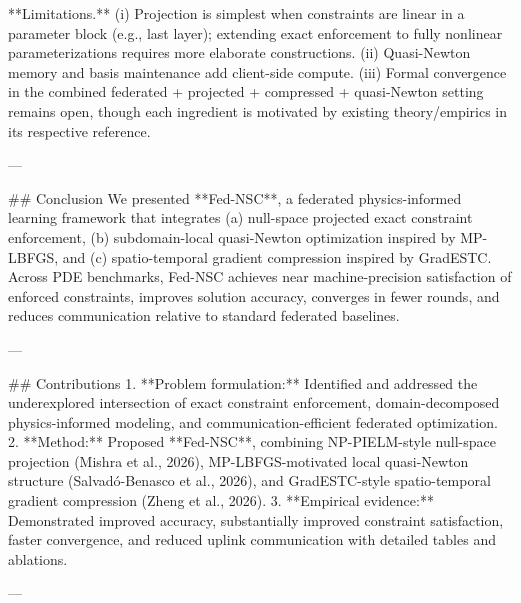 **Limitations.** (i) Projection is simplest when constraints are linear in a parameter block (e.g., last layer); extending exact enforcement to fully nonlinear parameterizations requires more elaborate constructions. (ii) Quasi-Newton memory and basis maintenance add client-side compute. (iii) Formal convergence in the combined federated + projected + compressed + quasi-Newton setting remains open, though each ingredient is motivated by existing theory/empirics in its respective reference.

---

## Conclusion  
We presented **Fed-NSC**, a federated physics-informed learning framework that integrates (a) null-space projected exact constraint enforcement, (b) subdomain-local quasi-Newton optimization inspired by MP-LBFGS, and (c) spatio-temporal gradient compression inspired by GradESTC. Across PDE benchmarks, Fed-NSC achieves near machine-precision satisfaction of enforced constraints, improves solution accuracy, converges in fewer rounds, and reduces communication relative to standard federated baselines.

---

## Contributions  
1. **Problem formulation:** Identified and addressed the underexplored intersection of exact constraint enforcement, domain-decomposed physics-informed modeling, and communication-efficient federated optimization.  
2. **Method:** Proposed **Fed-NSC**, combining NP-PIELM-style null-space projection (Mishra et al., 2026), MP-LBFGS-motivated local quasi-Newton structure (Salvadó-Benasco et al., 2026), and GradESTC-style spatio-temporal gradient compression (Zheng et al., 2026).  
3. **Empirical evidence:** Demonstrated improved accuracy, substantially improved constraint satisfaction, faster convergence, and reduced uplink communication with detailed tables and ablations.

---
